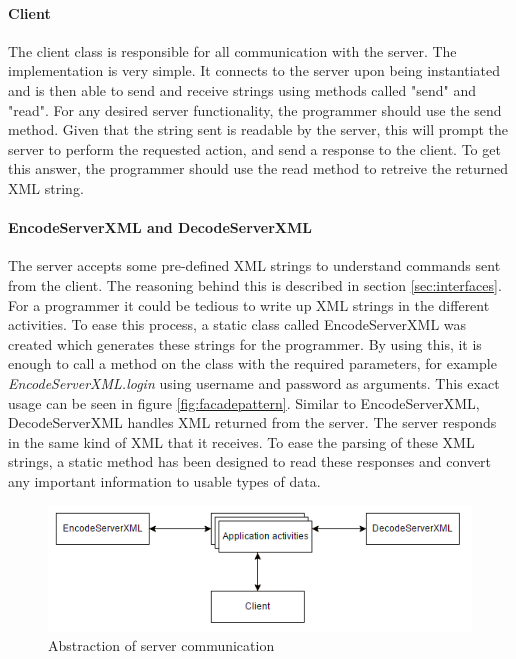 \paragraph{Client}
The client class is responsible for all communication with the server. The implementation is very simple. It connects to the server upon being instantiated and is then able to send and receive strings using methods called "send" and "read". For any desired server functionality, the programmer should use the send method. Given that the string sent is readable by the server, this will prompt the server to perform the requested action, and send a response to the client. To get this answer, the programmer should use the read method to retreive the returned XML string.

\paragraph{EncodeServerXML and DecodeServerXML}
The server accepts some pre-defined XML strings to understand commands sent from the client. The reasoning behind this is described in section \ref{sec:interfaces}. For a programmer it could be tedious to write up XML strings in the different activities. To ease this process, a static class called EncodeServerXML was created which generates these strings for the programmer. By using this, it is enough to call a method on the class with the required parameters, for example \textit{EncodeServerXML.login} using username and password as arguments. This exact usage can be seen in figure \ref{fig:facadepattern}. Similar to EncodeServerXML, DecodeServerXML handles XML returned from the server. The server responds in the same kind of XML that it receives. To ease the parsing of these XML strings, a static method has been designed to read these responses and convert any important information to usable types of data.

\begin{figure}[H]
\centering
\includegraphics[width=\textwidth]{billeder/appcommunication.png}
\caption{Abstraction of server communication}
\label{fig:appcommunication}
\end{figure}